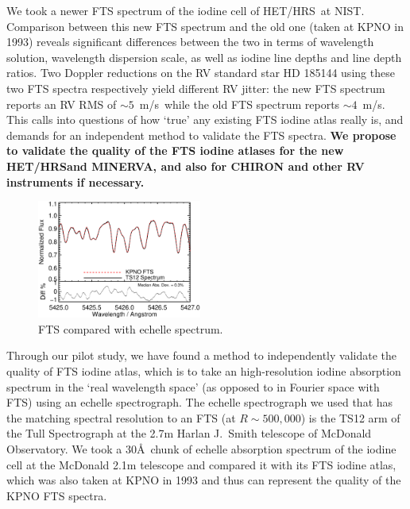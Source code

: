 \documentclass[12pt]{article}
\def\mps{m/s}
\def\minerva{MINERVA}
\def\hrs{HET/HRS}
\begin{document}
We took a newer FTS spectrum of the iodine cell of \hrs\ at
NIST. Comparison between this new FTS spectrum and the old one (taken
at KPNO in 1993) reveals significant differences between the two in
terms of wavelength solution, wavelength dispersion scale, as well as
iodine line depths and line depth ratios. Two Doppler reductions on
the RV standard star HD 185144 using these two FTS spectra
respectively yield different RV jitter: the new FTS spectrum reports
an RV RMS of $\sim5$~\mps\ while the old FTS spectrum reports
$\sim4$~\mps. This calls into questions of how `true' any existing FTS
iodine atlas really is, and demands for an independent method to
validate the FTS spectra. \textbf{We propose to validate the quality
  of the FTS iodine atlases for the new \hrs and \minerva, and also
  for CHIRON and other RV instruments if necessary.}

\begin{figure}
  \vspace{-35pt}
  \begin{center}
    \includegraphics[width=0.48\textwidth]{fts}
  \end{center}
  \vspace{-25pt}  
  \caption{FTS compared with echelle spectrum.}
  \vspace{-8pt}  
  \label{fig:fts}
\end{figure}

Through our pilot study, we have found a method to independently
validate the quality of FTS iodine atlas, which is to take an
high-resolution iodine absorption spectrum in the `real wavelength
space' (as opposed to in Fourier space with FTS) using an echelle
spectrograph. The echelle spectrograph we used that has the matching
spectral resolution to an FTS (at $R \sim 500,000$) is the TS12 arm of
the Tull Spectrograph at the 2.7m Harlan J.~Smith telescope of
McDonald Observatory. We took a 30\AA\ chunk of echelle absorption
spectrum of the iodine cell at the McDonald 2.1m telescope and
compared it with its FTS iodine atlas, which was also taken at KPNO in
1993 and thus can represent the quality of the KPNO FTS spectra.
\end{document}
